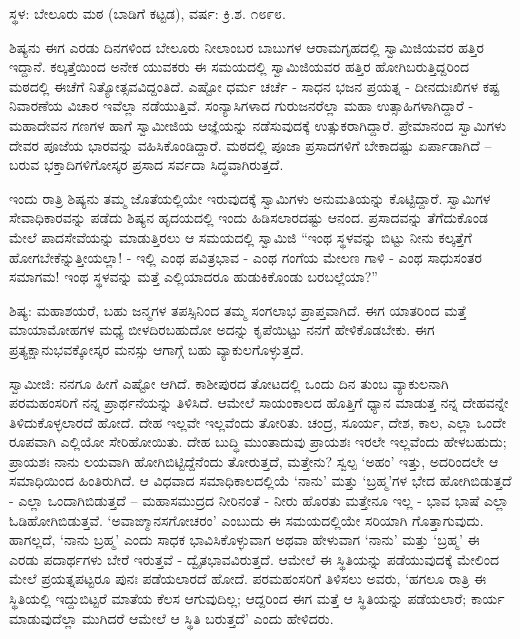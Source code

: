 \begin{center}
ಸ್ಥಳ: ಬೇಲೂರು ಮಠ (ಬಾಡಿಗೆ ಕಟ್ಟಡ), ವರ್ಷ: ಕ್ರಿ.ಶ. ೧೮೯೮.
\end{center}

ಶಿಷ್ಯನು ಈಗ ಎರಡು ದಿನಗಳಿಂದ ಬೇಲೂರು ನೀಲಾಂಬರ ಬಾಬುಗಳ ಆರಾಮಗೃಹದಲ್ಲಿ ಸ್ವಾಮಿಜಿಯವರ ಹತ್ತಿರ ಇದ್ದಾನೆ. ಕಲ್ಕತ್ತೆಯಿಂದ ಅನೇಕ ಯುವಕರು ಈ ಸಮಯದಲ್ಲಿ ಸ್ವಾಮಿಜಿಯವರ ಹತ್ತಿರ ಹೋಗಿಬರುತ್ತಿದ್ದರಿಂದ ಮಠದಲ್ಲಿ ಈಚೆಗೆ ನಿತ್ಯೋತ್ಸವವಿದ್ದಂತಿದೆ. ಎಷ್ಟೋ ಧರ್ಮ ಚರ್ಚೆ - ಸಾಧನ ಭಜನ ಪ್ರಯತ್ನ - ದೀನದುಃಖಿಗಳ ಕಷ್ಟ ನಿವಾರಣೆಯ ವಿಚಾರ ಇವೆಲ್ಲಾ ನಡೆಯುತ್ತಿವೆ. ಸಂನ್ಯಾಸಿಗಳಾದ ಗುರುಜನರೆಲ್ಲಾ ಮಹಾ ಉತ್ಸಾಹಿಗಳಾಗಿದ್ದಾರೆ - ಮಹಾದೇವನ ಗಣಗಳ ಹಾಗೆ ಸ್ವಾಮೀಜಿಯ ಆಜ್ಞೆಯನ್ನು ನಡೆಸುವುದಕ್ಕೆ ಉತ್ಸುಕರಾಗಿದ್ದಾರೆ. ಪ್ರೇಮಾನಂದ ಸ್ವಾಮಿಗಳು ದೇವರ ಪೂಜೆಯ ಭಾರವನ್ನು ವಹಿಸಿಕೊಂಡಿದ್ದಾರೆ. ಮಠದಲ್ಲಿ ಪೂಜಾ ಪ್ರಸಾದಗಳಿಗೆ ಬೇಕಾದಷ್ಟು ಏರ್ಪಾಡಾಗಿದೆ – ಬರುವ ಭಕ್ತಾದಿಗಳಿಗೋಸ್ಕರ ಪ್ರಸಾದ ಸರ್ವದಾ ಸಿದ್ಧವಾಗಿರುತ್ತದೆ.

ಇಂದು ರಾತ್ರಿ ಶಿಷ್ಯನು ತಮ್ಮ ಜೊತೆಯಲ್ಲಿಯೇ ಇರುವುದಕ್ಕೆ ಸ್ವಾಮಿಗಳು ಅನುಮತಿಯನ್ನು ಕೊಟ್ಟಿದ್ದಾರೆ. ಸ್ವಾಮಿಗಳ ಸೇವಾಧಿಕಾರವನ್ನು ಪಡೆದು ಶಿಷ್ಯನ ಹೃದಯದಲ್ಲಿ ಇಂದು ಹಿಡಿಸಲಾರದಷ್ಟು ಆನಂದ. ಪ್ರಸಾದವನ್ನು ತೆಗೆದುಕೊಂಡ ಮೇಲೆ ಪಾದಸೇವೆಯನ್ನು ಮಾಡುತ್ತಿರಲು ಆ ಸಮಯದಲ್ಲಿ ಸ್ವಾಮಿಜಿ “ಇಂಥ ಸ್ಥಳವನ್ನು ಬಿಟ್ಟು ನೀನು ಕಲ್ಕತ್ತೆಗೆ ಹೋಗಬೇಕೆನ್ನುತ್ತೀಯಲ್ಲಾ! - ಇಲ್ಲಿ ಎಂಥ ಪವಿತ್ರಭಾವ - ಎಂಥ ಗಂಗೆಯ ಮೇಲಣ ಗಾಳಿ - ಎಂಥ ಸಾಧುಸಂತರ ಸಮಾಗಮ! ಇಂಥ ಸ್ಥಳವನ್ನು ಮತ್ತೆ ಎಲ್ಲಿಯಾದರೂ ಹುಡುಕಿಕೊಂಡು ಬರಬಲ್ಲೆಯಾ?”

ಶಿಷ್ಯ: ಮಹಾಶಯರೆ, ಬಹು ಜನ್ಮಗಳ ತಪಸ್ಸಿನಿಂದ ತಮ್ಮ ಸಂಗಲಾಭ ಪ್ರಾಪ್ತವಾಗಿದೆ. ಈಗ ಯಾತರಿಂದ ಮತ್ತೆ ಮಾಯಾಮೋಹಗಳ ಮಧ್ಯೆ ಬೀಳದಿರಬಹುದೋ ಅದನ್ನು ಕೃಪೆಯಿಟ್ಟು ನನಗೆ ಹೇಳಿಕೊಡಬೇಕು. ಈಗ ಪ್ರತ್ಯಕ್ಷಾನುಭವಕ್ಕೋಸ್ಕರ ಮನಸ್ಸು ಆಗಾಗ್ಗೆ ಬಹು ವ್ಯಾಕುಲಗೊಳ್ಳುತ್ತದೆ.

ಸ್ವಾಮೀಜಿ: ನನಗೂ ಹೀಗೆ ಎಷ್ಟೋ ಆಗಿದೆ. ಕಾಶೀಪುರದ ತೋಟದಲ್ಲಿ ಒಂದು ದಿನ ತುಂಬ ವ್ಯಾಕುಲನಾಗಿ ಪರಮಹಂಸರಿಗೆ ನನ್ನ ಪ್ರಾರ್ಥನೆಯನ್ನು ತಿಳಿಸಿದೆ. ಆಮೇಲೆ ಸಾಯಂಕಾಲದ ಹೊತ್ತಿಗೆ ಧ್ಯಾನ ಮಾಡುತ್ತ ನನ್ನ ದೇಹವನ್ನೇ ತಿಳಿದುಕೊಳ್ಳಲಾರದೆ ಹೋದೆ. ದೇಹ ಇಲ್ಲವೇ ಇಲ್ಲವೆಂದು ತೋರಿತು. ಚಂದ್ರ, ಸೂರ್ಯ, ದೇಶ, ಕಾಲ, ಎಲ್ಲಾ ಒಂದೇ ರೂಪವಾಗಿ ಎಲ್ಲಿಯೋ ಸೇರಿಹೋಯಿತು. ದೇಹ ಬುದ್ಧಿ ಮುಂತಾದುವು ಪ್ರಾಯಶಃ ಇರಲೇ ಇಲ್ಲವೆಂದು ಹೇಳಬಹುದು; ಪ್ರಾಯಶಃ ನಾನು ಲಯವಾಗಿ ಹೋಗಿಬಿಟ್ಟಿದ್ದೆನೆಂದು ತೋರುತ್ತದೆ, ಮತ್ತೇನು? ಸ್ವಲ್ಪ ‘ಅಹಂ’ ಇತ್ತು, ಅದರಿಂದಲೇ ಆ ಸಮಾಧಿಯಿಂದ ಹಿಂತಿರುಗಿದೆ. ಆ ವಿಧವಾದ ಸಮಾಧಿಕಾಲದಲ್ಲಿಯೆ ‘ನಾನು’ ಮತ್ತು ‘ಬ್ರಹ್ಮ’ಗಳ ಭೇದ ಹೋಗಿಬಿಡುತ್ತದೆ - ಎಲ್ಲಾ ಒಂದಾಗಿಬಿಡುತ್ತದೆ – ಮಹಾಸಮುದ್ರದ ನೀರಿನಂತೆ - ನೀರು ಹೊರತು ಮತ್ತೇನೂ ಇಲ್ಲ - ಭಾವ ಭಾಷೆ ಎಲ್ಲಾ ಓಡಿಹೋಗಿಬಿಡುತ್ತವೆ. ‘ಅವಾಙ್ಮಾನಸಗೋಚರಂ’ ಎಂಬುದು ಈ ಸಮಯದಲ್ಲಿಯೇ ಸರಿಯಾಗಿ ಗೊತ್ತಾಗುವುದು. ಹಾಗಲ್ಲದೆ, ‘ನಾನು ಬ್ರಹ್ಮ’ ಎಂದು ಸಾಧಕ ಭಾವಿಸಿಕೊಳ್ಳುವಾಗ ಅಥವಾ ಹೇಳುವಾಗ ‘ನಾನು’ ಮತ್ತು ‘ಬ್ರಹ್ಮ’ ಈ ಎರಡು ಪದಾರ್ಥಗಳು ಬೇರೆ ಇರುತ್ತವೆ - ದ್ವೈತಭಾವವಿರುತ್ತದೆ. ಆಮೇಲೆ ಈ ಸ್ಥಿತಿಯನ್ನು ಪಡೆಯುವುದಕ್ಕೆ ಮೇಲಿಂದ ಮೇಲೆ ಪ್ರಯತ್ನಪಟ್ಟರೂ ಪುನಃ ಪಡೆಯಲಾರದೆ ಹೋದೆ. ಪರಮಹಂಸರಿಗೆ ತಿಳಿಸಲು ಅವರು, ‘ಹಗಲೂ ರಾತ್ರಿ ಈ ಸ್ಥಿತಿಯಲ್ಲಿ ಇದ್ದುಬಿಟ್ಟರೆ ಮಾತೆಯ ಕೆಲಸ ಆಗುವುದಿಲ್ಲ; ಆದ್ದರಿಂದ ಈಗ ಮತ್ತೆ ಆ ಸ್ಥಿತಿಯನ್ನು ಪಡೆಯಲಾರೆ; ಕಾರ್ಯ ಮಾಡುವುದೆಲ್ಲಾ ಮುಗಿದರೆ ಆಮೇಲೆ ಆ ಸ್ಥಿತಿ ಬರುತ್ತದೆ’ ಎಂದು ಹೇಳಿದರು.

